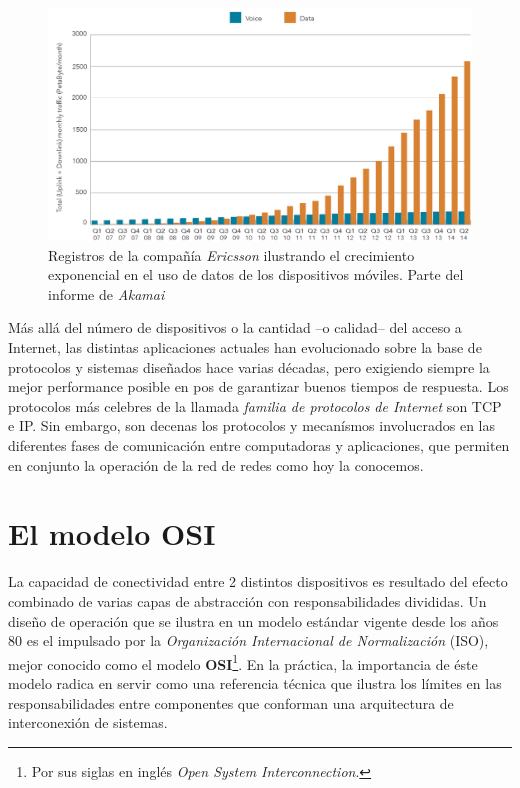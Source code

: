 \begin{figure}[!h]
	\centering
	\includegraphics[scale=0.5]{imagenes/conexiones_moviles}
	\caption{Registros de la compañía \emph{Ericsson} ilustrando el crecimiento exponencial en el uso de datos de los dispositivos móviles. Parte del informe de \emph{Akamai} \cite{report:akamai}}
	\label{fig:akamai_stats}
\end{figure}

Más allá del número de dispositivos o la cantidad --o calidad-- del acceso a Internet, las distintas aplicaciones actuales han evolucionado sobre la base de protocolos y sistemas diseñados hace varias décadas, pero exigiendo siempre la mejor performance posible en pos de garantizar buenos tiempos de respuesta. Los protocolos más celebres de la llamada \emph{familia de protocolos de Internet} son TCP e IP. Sin embargo, son decenas los protocolos y mecanísmos involucrados en las diferentes fases de comunicación entre computadoras y aplicaciones, que permiten en conjunto la operación de la red de redes como hoy la conocemos.

\section{El modelo OSI}
La capacidad de conectividad entre 2 distintos dispositivos es resultado del efecto combinado de varias capas de abstracción con responsabilidades divididas. Un diseño de operación que se ilustra en un modelo estándar vigente desde los años 80 es el impulsado por la \emph{Organización Internacional de Normalización} (ISO), mejor conocido como el modelo \textbf{OSI}\footnote{Por sus siglas en inglés \emph{Open System Interconnection}.}. En la práctica, la importancia de éste modelo radica en servir como una referencia técnica que ilustra los límites en las responsabilidades entre componentes que conforman una arquitectura de interconexión de sistemas.

